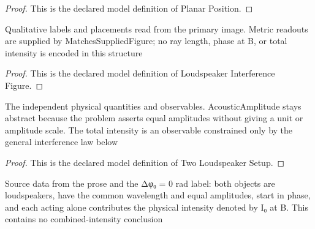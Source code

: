 \begin{proof}
  This is the declared model definition of Planar Position.
\end{proof}
\begin{definition}
  \label{def:physics:phyx-mini-0246:phyxminiproblems-problemphyxmini0246-loudspeakerinterferencefigure}
  Qualitative labels and placements read from the primary image. Metric readouts are supplied by MatchesSuppliedFigure; no ray length, phase at B, or total intensity is encoded in this structure
\end{definition}
\begin{proof}
  This is the declared model definition of Loudspeaker Interference Figure.
\end{proof}
\begin{definition}
  \label{def:physics:phyx-mini-0246:phyxminiproblems-problemphyxmini0246-twoloudspeakersetup}
  The independent physical quantities and observables. AcousticAmplitude stays abstract because the problem asserts equal amplitudes without giving a unit or amplitude scale. The total intensity is an observable constrained only by the general interference law below
\end{definition}
\begin{proof}
  This is the declared model definition of Two Loudspeaker Setup.
\end{proof}
\begin{definition}
  \label{def:physics:phyx-mini-0246:phyxminiproblems-problemphyxmini0246-matchessourcedescription}
  Source data from the prose and the Δφ₀ = 0 rad label: both objects are loudspeakers, have the common wavelength and equal amplitudes, start in phase, and each acting alone contributes the physical intensity denoted by I₀ at B. This contains no combined-intensity conclusion
\end{definition}
